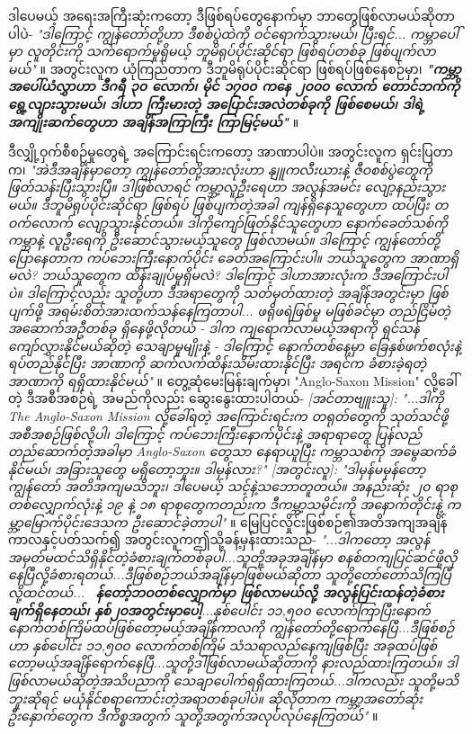 \documentclass[10pt,twocolumn,letterpaper]{article}
\begin{document}
ဒါပေမယ့် အရေးအကြီးဆုံးကတော့ ဒီဖြစ်ရပ်တွေနောက်မှာ ဘာတွေဖြစ်လာမယ်ဆိုတာပါပဲ- \textit{"ဒါကြောင့် ကျွန်တော်တို့ဟာ ဒီစစ်ပွဲထဲကို ဝင်ရောက်သွားမယ်၊ ပြီးရင်... ကမ္ဘာပေါ်မှာ လူတိုင်းကို သက်ရောက်မှုရှိမယ့် ဘူမိရုပ်ပိုင်းဆိုင်ရာ ဖြစ်ရပ်တစ်ခု ဖြစ်ပျက်လာမယ်"} \cite{4}။ အတွင်းလူက ယုံကြည်တာက ဒီဘူမိရုပ်ပိုင်းဆိုင်ရာ ဖြစ်ရပ်ဖြစ်နေစဉ်မှာ၊ \textit{\textbf{"ကမ္ဘာ့အပေါ်ယံလွှာဟာ ဒီဂရီ ၃၀ လောက်၊ မိုင် ၁၇၀၀ ကနေ ၂၀၀၀ လောက် တောင်ဘက်ကို ရွေ့လျားသွားမယ်၊ ဒါဟာ ကြီးမားတဲ့ အပြောင်းအလဲတစ်ခုကို ဖြစ်စေမယ်၊ ဒါရဲ့အကျိုးဆက်တွေဟာ အချိန်အကြာကြီး ကြာမြင့်မယ်"}} \cite{4}။

ဒီလျှို့ဝှက်စီစဉ်မှုတွေရဲ့ အကြောင်းရင်းကတော့ အာဏာပါပဲ။ အတွင်းလူက ရှင်းပြတာက၊ \textit{"အဲဒီအချိန်မှာတော့ ကျွန်တော်တို့အားလုံးဟာ နျူကလီးယားနဲ့ ဇီဝစစ်ပွဲတွေကို ဖြတ်သန်းပြီးသွားပြီ။ ဒါဖြစ်လာရင် ကမ္ဘာ့လူဦးရေဟာ အလွန်အမင်း လျော့နည်းသွားမယ်။ ဒီဘူမိရုပ်ပိုင်းဆိုင်ရာ ဖြစ်ရပ် ဖြစ်ပျက်တဲ့အခါ ကျန်ရှိနေသူတွေဟာ ထပ်ပြီး တဝက်လောက် လျော့သွားနိုင်တယ်။ ဒါကိုကျော်ဖြတ်နိုင်သူတွေဟာ နောက်ခေတ်သစ်ကို ကမ္ဘာနဲ့ လူဦးရေကို ဦးဆောင်သွားမယ့်သူတွေ ဖြစ်လာမယ်။ ဒါကြောင့် ကျွန်တော်တို့ပြောနေတာက ကပ်ဘေးကြီးနောက်ပိုင်း ခေတ်အကြောင်းပါ။ ဘယ်သူတွေက အာဏာရှိမလဲ? ဘယ်သူတွေက ထိန်းချုပ်မှုရှိမလဲ? ဒါကြောင့် ဒါဟာအားလုံးက ဒီအကြောင်းပါပဲ။ ဒါကြောင့်လည်း သူတို့ဟာ ဒီအရာတွေကို သတ်မှတ်ထားတဲ့ အချိန်အတွင်းမှာ ဖြစ်ပျက်ဖို့ အရမ်းစိတ်အားထက်သန်နေကြတာပါ... ဖရိုဖရဲဖြစ်မှု မဖြစ်ခင်မှာ တည်ငြိမ်တဲ့ အဆောက်အဦတစ်ခု ရှိနေဖို့လိုတယ် - ဒါက ကျရောက်လာမယ့်အရာကို ရှင်သန်ကျော်လွှားနိုင်မယ်ဆိုတဲ့ သေချာမှုမျိုးနဲ့ - ဒါကြောင့် နောက်တစ်နေ့မှာ ခြေနှစ်ဖက်စလုံးနဲ့ ရပ်တည်နိုင်ပြီး အာဏာကို ဆက်လက်ထိန်းသိမ်းထားနိုင်ပြီး အရင်က ခံစားခဲ့ရတဲ့ အာဏာကို ရရှိထားနိုင်မယ်"} \cite{4}။ တွေ့ဆုံမေးမြန်းချက်မှာ၊ "Anglo-Saxon Mission" လို့ခေါ်တဲ့ ဒီအစီအစဉ်ရဲ့ အမည်ကိုလည်း ဆွေးနွေးထားပါတယ်- \textit{[အင်တာဗျူးသူ]: "...ဒါကို The Anglo-Saxon Mission လို့ခေါ်ရတဲ့ အကြောင်းရင်းက တရုတ်တွေကို သုတ်သင်ဖို့ အစီအစဉ်ဖြစ်လို့ပါ၊ ဒါကြောင့် ကပ်ဘေးကြီးနောက်ပိုင်းနဲ့ အရာရာတွေ ပြန်လည်တည်ဆောက်တဲ့အခါမှာ Anglo-Saxon တွေသာ နေရာယူပြီး ကမ္ဘာသစ်ကို အမွေဆက်ခံနိုင်မယ်၊ အခြားသူတွေ မရှိတော့ဘူး။ ဒါမှန်လား?" [အတွင်းလူ]: "ဒါမှန်မမှန်တော့ ကျွန်တော် အတိအကျမသိဘူး၊ ဒါပေမယ့် သင့်နဲ့သဘောတူတယ်။ အနည်းဆုံး ၂၀ ရာစုတစ်လျှောက်လုံးနဲ့ ၁၉ နဲ့ ၁၈ ရာစုတွေကတည်းက ဒီကမ္ဘာ့သမိုင်းကို အနောက်တိုင်းနဲ့ ကမ္ဘာ့မြောက်ပိုင်းဒေသက ဦးဆောင်ခဲ့တာပါ"} \cite{4}။
မြေပြင်လှိုင်းဖြစ်စဉ်၏အတိအကျအချိန်ကာလနှင့်ပတ်သက်၍ အတွင်းလူကဤသို့ခန့်မှန်းထားသည်- \textit{"...ဒါကတော့ အလွန်အမှတ်မထင်သိရှိနိုင်တဲ့ခံစားချက်တစ်ခုပါ...သူတို့အခုအချိန်မှာ စနစ်တကျပြင်ဆင်ဖို့လိုနေပြီလို့ခံစားရတယ်...ဒီဖြစ်စဉ်ဘယ်အချိန်မှာဖြစ်မယ်ဆိုတာ သူတို့တော်တော်သိကြပြီလို့ထင်တယ်... \textbf{�ျွန်တော့်ဘဝတစ်လျှောက်မှာ ဖြစ်လာမယ်လို့ အလွန်ပြင်းထန်တဲ့ခံစားချက်ရှိနေတယ်၊ နှစ်၂၀အတွင်းမှာပေါ့}...နှစ်ပေါင်း ၁၁,၅၀၀ လောက်ကြာပြီးနောက် နောက်တစ်ကြိမ်ထပ်ဖြစ်တော့မယ့်အချိန်ကာလကို ကျွန်တော်တို့ရောက်နေပြီ...ဒီဖြစ်စဉ်ဟာ နှစ်ပေါင်း ၁၁,၅၀၀ လောက်တစ်ကြိမ် သံသရာလည်နေကျဖြစ်ပြီး အခုထပ်ဖြစ်တော့မယ့်အချိန်ရောက်နေပြီ...သူတို့ဒါဖြစ်လာမယ်ဆိုတာကို နားလည်ထားကြတယ်။ ဒါဖြစ်လာမယ်ဆိုတဲ့အသိပညာကို သေချာပေါက်ရရှိထားကြတယ်...ဒါကလည်း သူတို့မသိဘူးဆိုရင် မယုံနိုင်စရာကောင်းတဲ့အရာတစ်ခုပါပဲ။ ဆိုလိုတာက ကမ္ဘာ့အတော်ဆုံးဦးနှောက်တွေက ဒီကိစ္စအတွက် သူတို့အတွက်အလုပ်လုပ်နေကြတယ်"} \cite{4}။
\end{document}
